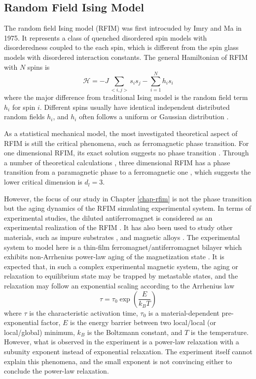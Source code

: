 \subsection{Random Field Ising Model}
\label{sec:intro-rfim}
The random field Ising model (RFIM) was first introcuded by Imry and Ma \cite{imry1975random} in 1975. It represents a class of quenched disordered spin models \cite{young1997spin} with  disorderedness coupled to the each spin, which is different from the spin glass models with disordered interaction constants. The general Hamiltonian of RFIM with $N$ spins is
\begin{equation}
\mathcal{H}=-J\sum_{<i,j>}s_{i}s_{j}-\sum_{i=1}^{N}h_{i}s_{i}
\end{equation}
where the major difference from traditional Ising model is the random field term $h_i$ for spin $i$. Different spins usually have  identical independent distributed random fields $h_i$, and $h_i$ often follows a uniform \cite{nattermann1997theory} or Gaussian distribution \cite{newman1999}.

As a statistical mechanical model, the most investigated theoretical aspect of RFIM is still the critical phenomena, such as ferromagnetic phase transition. For one dimensional RFIM, its exact solution suggests no phase transition \cite{grinstein1983exact}. Through a number of theoretical calculations \cite{parisi1979random, bricmont1987lower}, three dimensional RFIM has a phase transition from a paramagnetic phase to a ferromagnetic one  \cite{bricmont1987lower}, which suggests the lower critical dimension is $d_l = 3$. 

However, the focus of our study in Chapter \ref{chap-rfim} is not the phase transition but the aging dynamics of the RFIM simulating experimental system. In terms of experimental studies, the diluted antiferromagnet is considered as an experimental realization of the RFIM \cite{belanger1985, fernandez1988random}. It has also been used to study other materials, such as  impure substrates \cite{villain1982commensurate}, and magnetic alloys \cite{fisher1988theory}. 
The experimental system to model here is a thin-film ferromagnet/antiferromagnet bilayer which exhibits non-Arrhenius power-law aging of the magnetization state \cite{ma2016prb}. 
It is expected that, in such a complex experimental magnetic system, the aging or relaxation to equilibrium state may be trapped by metastable states, and the relaxation may follow an exponential scaling according to the Arrhenius law \cite{Arrhenius1989}
\begin{equation}
\tau = \tau_0 \exp \left( \frac{E}{k_B T}\right)
\end{equation}
where $\tau$ is the characteristic activation time, $\tau_0$ is a material-dependent pre-exponential factor, $E$ is the energy barrier between two local/local (or local/global) minimum, $k_B$ is the Boltzmann constant, and $T$ is the temperature. However, what is observed in the experiment is a power-law relaxation with a subunity exponent instead of exponential relaxation. The experiment itself cannot explain this phenomena, and the small exponent is not convincing either to conclude the power-law relaxation. 

